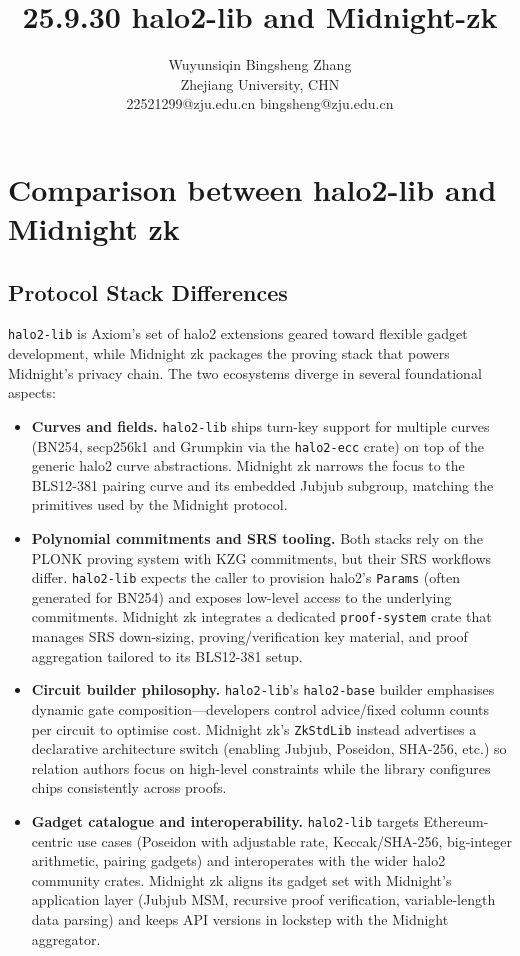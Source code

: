 \documentclass{article}
\title{25.9.30 halo2-lib and Midnight-zk}
\author{Wuyunsiqin \quad \quad Bingsheng Zhang \\ 
Zhejiang University, CHN \\
22521299@zju.edu.cn \quad bingsheng@zju.edu.cn}
\begin{document}
\maketitle


\section{Comparison between halo2-lib and Midnight zk}

\subsection{Protocol Stack Differences}

\texttt{halo2-lib} is Axiom's set of halo2 extensions geared toward flexible gadget development, while Midnight zk packages the proving stack that powers Midnight's privacy chain. The two ecosystems diverge in several foundational aspects:

\begin{itemize}
    \item \textbf{Curves and fields.} \texttt{halo2-lib} ships turn-key support for multiple curves (BN254, secp256k1 and Grumpkin via the \texttt{halo2-ecc} crate) on top of the generic halo2 curve abstractions. Midnight zk narrows the focus to the BLS12-381 pairing curve and its embedded Jubjub subgroup, matching the primitives used by the Midnight protocol.
    \item \textbf{Polynomial commitments and SRS tooling.} Both stacks rely on the PLONK proving system with KZG commitments, but their SRS workflows differ. \texttt{halo2-lib} expects the caller to provision halo2's \texttt{Params} (often generated for BN254) and exposes low-level access to the underlying commitments. Midnight zk integrates a dedicated \texttt{proof-system} crate that manages SRS down-sizing, proving/verification key material, and proof aggregation tailored to its BLS12-381 setup.
    \item \textbf{Circuit builder philosophy.} \texttt{halo2-lib}'s \texttt{halo2-base} builder emphasises dynamic gate composition—developers control advice/fixed column counts per circuit to optimise cost. Midnight zk's \texttt{ZkStdLib} instead advertises a declarative architecture switch (enabling Jubjub, Poseidon, SHA-256, etc.) so relation authors focus on high-level constraints while the library configures chips consistently across proofs.
    \item \textbf{Gadget catalogue and interoperability.} \texttt{halo2-lib} targets Ethereum-centric use cases (Poseidon with adjustable rate, Keccak/SHA-256, big-integer arithmetic, pairing gadgets) and interoperates with the wider halo2 community crates. Midnight zk aligns its gadget set with Midnight's application layer (Jubjub MSM, recursive proof verification, variable-length data parsing) and keeps API versions in lockstep with the Midnight aggregator.
\end{itemize}
\end{document}
